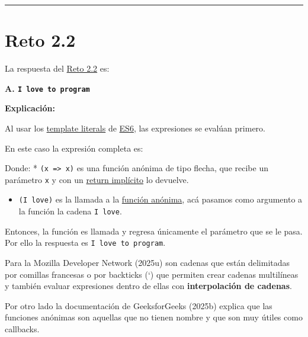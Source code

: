 \documentclass[
  letterpaper,
  DIV=11,
  numbers=noendperiod]{scrreprt}
\newenvironment{Shaded}{\begin{snugshade}}{\end{snugshade}}
\newcommand{\KeywordTok}[1]{\textcolor[rgb]{0.00,0.23,0.31}{\textbf{#1}}}
\newcommand{\NormalTok}[1]{\textcolor[rgb]{0.00,0.23,0.31}{#1}}
\newcommand{\StringTok}[1]{\textcolor[rgb]{0.13,0.47,0.30}{#1}}
\providecommand{\tightlist}{%
  \setlength{\itemsep}{0pt}\setlength{\parskip}{0pt}}
\begin{document}
\begin{center}\rule{0.5\linewidth}{0.5pt}\end{center}

\section{Reto 2.2}\label{sec-sol-cap2-reto2}

La respuesta del \hyperref[sec-cap2-reto2]{Reto 2.2} es:

\textbf{A. \texttt{I\ love\ to\ program}}

\textbf{Explicación:}

Al usar los \hyperref[glos-template_literals]{template literals} de
\hyperref[glos-es6]{ES6}, las expresiones se evalúan primero.

En este caso la expresión completa es:

\begin{Shaded}
\end{Shaded}

Donde: * \texttt{(x\ =\textgreater{}\ x)} es una función anónima de tipo
flecha, que recibe un parámetro \texttt{x} y con un
\hyperref[glos-return_impluxedcito]{return implícito} lo devuelve.

\begin{itemize}
\tightlist
\item
  \texttt{(\textquotesingle{}I\ love\textquotesingle{})} es la llamada a
  la \hyperref[glos-funcion_anonima]{función anónima}, acá pasamos como
  argumento a la función la cadena \texttt{I\ love}.
\end{itemize}

Entonces, la función es llamada y regresa únicamente el parámetro que se
le pasa. Por ello la respuesta es \texttt{I\ love\ to\ program}.

Para la Mozilla Developer Network (2025u) son cadenas que están
delimitadas por comillas francesas o por backticks (`) que permiten
crear cadenas multilíneas y también evaluar expresiones dentro de ellas
con \textbf{interpolación de cadenas}.

Por otro lado la documentación de GeeksforGeeks (2025b) explica que las
funciones anónimas son aquellas que no tienen nombre y que son muy
útiles como callbacks.
\end{document}
